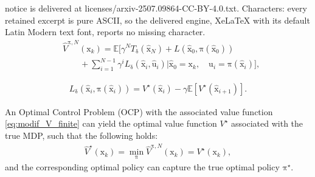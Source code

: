 \documentclass[10pt,a4paper]{amsart}
\newcommand{\vect}[1]{\ensuremath{\boldsymbol{\mathrm{#1}}}}
\begin{document}
notice is delivered at licenses/arxiv-2507.09864-CC-BY-4.0.txt. Characters: every retained excerpt is pure ASCII, so the delivered engine, XeLaTeX with its default Latin Modern text font, reports no missing character.
\begin{align}\label{eq:modif_V_finite}
    &\hat V^{\vect\pi,N}\left(\vect x_k\right)=\mathbb{E}\Bigg[\gamma^N T_{\vect\delta}\left(\vect {\hat x}_N\right)+L\left(\hat{\vect {x}}_0,\vect\pi\left(\hat{\vect {x}}_0\right)\right)\\\nonumber
    &\qquad+\sum_{i=1}^{N-1}\gamma^i L_{\vect\delta}\left(\vect {\hat x}_{i},\vect {\hat u}_{i}\right)\Big|\hat{\vect {x}}_0=\vect x_k,\quad \hat{\vect {u}}_i=\vect\pi\left(\hat{\vect {x}}_i\right)\Bigg],
\end{align}

\begin{align}\label{eq:modif_L}
     L_{\vect{\delta}}(\hat{\vect{x}}_i, \vect{\pi}(\hat{\vect{x}}_i)) = V^\star(\hat{\vect{x}}_i) - \gamma \mathbb{E}[V^\star(\hat{\vect{x}}_{i+1})].
\end{align}

\begin{theorem}\label{theorem:V_modif}
    An Optimal Control Problem (OCP) with the associated value function \eqref{eq:modif_V_finite} can yield the optimal value function $V^\star$ associated with the true MDP, such that the following holds:
    \begin{align}
        \hat V^\star\left(\vect x_k\right)=\min_{\vect\pi}\hat V^{\vect\pi,N}\left(\vect x_k\right)=V^\star\left(\vect x_k\right),
    \end{align}
    and the corresponding optimal policy can capture the true optimal policy $\vect\pi^\star$.
\end{theorem}
\end{document}
